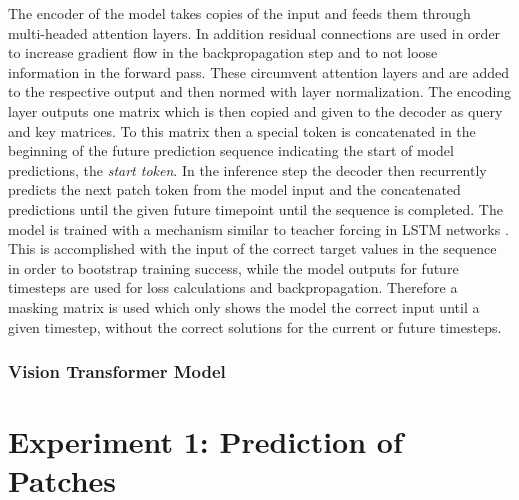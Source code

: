 \documentclass[12pt]{article}
\begin{document}
The encoder of the model takes copies of the input and feeds them through multi-headed attention layers. In addition residual connections are used in order to increase gradient flow in the backpropagation step and to not loose information in the forward pass. These circumvent attention layers and are added to the respective output and then normed with layer normalization. The encoding layer outputs one matrix which is then copied and given to the decoder as query and key matrices. To this matrix then a special token is concatenated in the beginning of the future prediction sequence indicating the start of model predictions, the \textit{start token}. In the inference step the decoder then recurrently predicts the next patch token from the model input and the concatenated predictions until the given future timepoint until the sequence is completed. The model is trained with a mechanism similar to teacher forcing in LSTM networks \citep{gers2002learning}. This is accomplished with the input of the correct target values in the sequence in order to bootstrap training success, while the model outputs for future timesteps are used for loss calculations and backpropagation. Therefore a masking matrix is used which only shows the model the correct input until a given timestep, without the correct solutions for the current or future timesteps.

\subsubsection{Vision Transformer Model}




\section{Experiment 1: Prediction of Patches}
\end{document}
